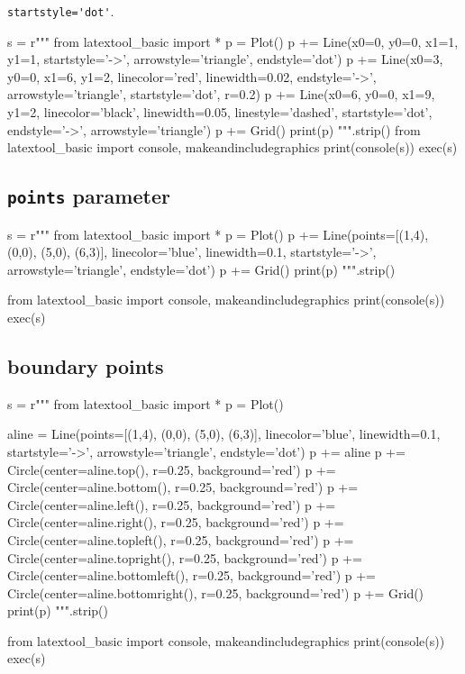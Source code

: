 \newpage
\verb!startstyle='dot'!.
\begin{python}
s = r"""
from latextool_basic import *
p = Plot()
p += Line(x0=0, y0=0, x1=1, y1=1, startstyle='->', 
                                  arrowstyle='triangle', endstyle='dot')
p += Line(x0=3, y0=0, x1=6, y1=2, linecolor='red', linewidth=0.02, 
                                  endstyle='->', arrowstyle='triangle',
                                  startstyle='dot', r=0.2)
p += Line(x0=6, y0=0, x1=9, y1=2, linecolor='black', linewidth=0.05, 
                                  linestyle='dashed', startstyle='dot', 
                                  endstyle='->',  arrowstyle='triangle')
p += Grid()
print(p)
""".strip()
from latextool_basic import console, makeandincludegraphics
print(console(s))
exec(s)
\end{python}


\newpage
\subsection{\texttt{points} parameter}

\begin{python}
s = r"""
from latextool_basic import *
p = Plot()
p += Line(points=[(1,4), (0,0), (5,0), (6,3)], 
          linecolor='blue', linewidth=0.1, 
          startstyle='->', arrowstyle='triangle', endstyle='dot')
p += Grid()
print(p)
""".strip()

from latextool_basic import console, makeandincludegraphics
print(console(s))
exec(s)
\end{python}


\newpage
\subsection{boundary points}

\begin{python}
s = r"""
from latextool_basic import *
p = Plot()

aline = Line(points=[(1,4), (0,0), (5,0), (6,3)], 
             linecolor='blue', linewidth=0.1, 
             startstyle='->', arrowstyle='triangle', endstyle='dot')
p += aline
p += Circle(center=aline.top(), r=0.25, background='red')
p += Circle(center=aline.bottom(), r=0.25, background='red')
p += Circle(center=aline.left(), r=0.25, background='red')
p += Circle(center=aline.right(), r=0.25, background='red')
p += Circle(center=aline.topleft(), r=0.25, background='red')
p += Circle(center=aline.topright(), r=0.25, background='red')
p += Circle(center=aline.bottomleft(), r=0.25, background='red')
p += Circle(center=aline.bottomright(), r=0.25, background='red')
p += Grid()
print(p)
""".strip()

from latextool_basic import console, makeandincludegraphics
print(console(s))
exec(s)
\end{python}


